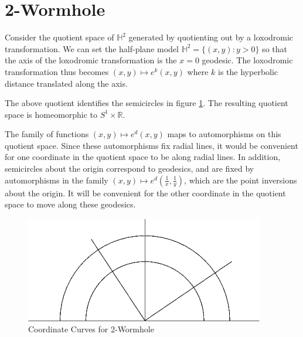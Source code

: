 \section{2-Wormhole}


Consider the quotient space of $\mathbb{H}^2$ generated by quotienting out by a loxodromic transformation. We can set the half-plane model $\mathbb{H}^2 = \{(x,y):y>0\}$ so that the axis of the loxodromic transformation is the $x=0$ geodesic. The loxodromic transformation thus becomes $(x,y) \mapsto e^k(x,y)$ where $k$ is the hyperbolic distance translated along the axis.


The above quotient identifies the semicircles in figure \ref{fig:coordinatecurves}. The resulting quotient space is homeomorphic to $S^1 \times \mathbb{R}$.


The family of functions $(x,y) \mapsto e^d(x,y)$ maps to automorphisms on this quotient space. Since these automorphisms fix radial lines, it would be convenient for one coordinate in the quotient space to be along radial lines. In addition, semicircles about the origin correspond to geodesics, and are fixed by automorphisms in the family $(x,y) \mapsto e^d\left(\frac{1}{x},\frac{1}{y}\right)$, which are the point inversions about the origin. It will be convenient for the other coordinate in the quotient space to move along these geodesics.

\begin{figure}[h]
\includegraphics[scale=0.5]{../images/RadialLines.png}
\caption{Coordinate Curves for 2-Wormhole}
\label{fig:coordinatecurves}
\end{figure}

